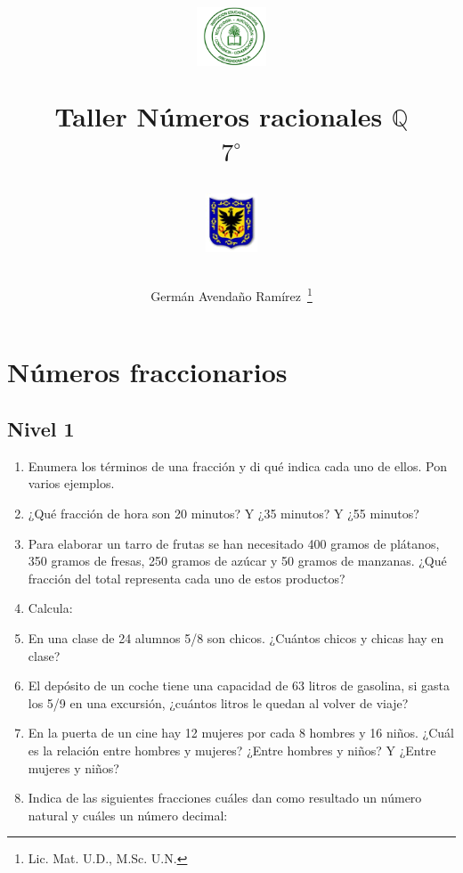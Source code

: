\documentclass[10pt,twoside]{article}
\author{Germ\'an Avenda\~no Ram\'irez~\thanks{Lic. Mat. U.D., M.Sc. U.N.}}
\title{\begin{minipage}{.2\textwidth}
\includegraphics[height=1.75cm]{Images/logo-colegio.png}\end{minipage}
\begin{minipage}{.55\textwidth}
\begin{center}
Taller Números racionales $\mathbb{Q}$\\$7^{\circ}$
\end{center}
\end{minipage}\hfill
\begin{minipage}{.2\textwidth}
\includegraphics[height=1.75cm]{Images/logo-sed.png} 
\end{minipage}}
\date{}
\begin{document}
\maketitle
\section*{Números fraccionarios}
\subsection*{Nivel 1}
\begin{enumerate}
\item Enumera los términos de una fracción y di qué indica cada
uno de ellos. Pon varios ejemplos.
\item ¿Qué fracción de hora son 20 minutos? Y ¿35 minutos? Y
¿55 minutos?
\item Para elaborar un tarro de frutas se han necesitado 400 gramos de plátanos, 350 gramos de fresas, 250 gramos de azúcar y 50 gramos de manzanas. ¿Qué fracción del total representa cada uno de estos productos?
\item Calcula:
\begin{enumerate}
\end{enumerate}
\item En una clase de 24 alumnos 5/8 son chicos. ¿Cuántos chicos
y chicas hay en clase?
\item El depósito de un coche tiene una capacidad de 63 litros de
gasolina, si gasta los 5/9 en una excursión, ¿cuántos litros le
quedan al volver de viaje?
\item En la puerta de un cine hay 12 mujeres por cada 8 hombres
y 16 niños. ¿Cuál es la relación entre hombres y mujeres?
¿Entre hombres y niños? Y ¿Entre mujeres y niños?
\item Indica de las siguientes fracciones cuáles dan como resultado un número natural y cuáles un número decimal:
\begin{enumerate}
\end{enumerate}
\end{enumerate}
\end{document}
